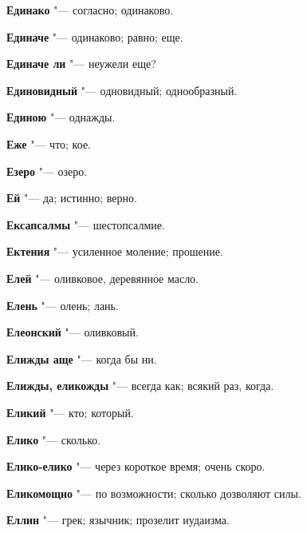 \begin{mymulticols}{2}
\noindent\textbf{Единако} "--- согласно; одинаково. 




\noindent\textbf{Единаче} "--- одинаково; равно; еще. 




\noindent\textbf{Единаче ли} "--- неужели еще? 




\noindent\textbf{Единовидный} "--- одновидный; однообразный. 




\noindent\textbf{Единою} "--- однажды. 




\noindent\textbf{Еже} "--- что; кое. 




\noindent\textbf{Езеро} "--- озеро. 




\noindent\textbf{Ей} "--- да; истинно; верно. 




\noindent\textbf{Ексапсалмы} "--- шестопсалмие. 




\noindent\textbf{Ектения} "--- усиленное моление; прошение. 




\noindent\textbf{Елей} "--- оливковое, деревянное масло. 




\noindent\textbf{Елень} "--- олень; лань. 




\noindent\textbf{Елеонский} "--- оливковый. 




\noindent\textbf{Елижды аще} "--- когда бы ни. 




\noindent\textbf{Елижды, еликожды} "--- всегда как; всякий раз, когда. 




\noindent\textbf{Еликий} "--- кто; который. 




\noindent\textbf{Елико} "--- сколько. 




\noindent\textbf{Елико-елико} "--- через короткое время; очень скоро. 




\noindent\textbf{Еликомощно} "--- по возможности; сколько дозволяют силы. 




\noindent\textbf{Еллин} "--- грек; язычник; прозелит иудаизма. 





\end{mymulticols}
